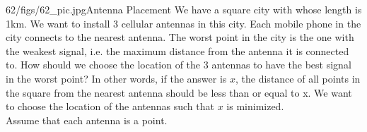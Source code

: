 \begin{problem}{62/figs/62_pic.jpg}{Antenna Placement} We have a square city with whose length is 1km. We want to install 3 cellular antennas in this city.
	Each mobile phone in the city connects to the nearest antenna. The worst point in the city is the one with the weakest signal, i.e. the maximum distance from the antenna it is connected to.
	How should we choose the location of the 3 antennas to have the best signal in the worst point?
	In other words, if the answer is $x$, the distance of all points in the square from the nearest antenna should be less than or equal to x. We want to choose the location of the antennas such that $x$ is minimized.\\[0.2cm]
	Assume that each antenna is a point.
\end{problem}
